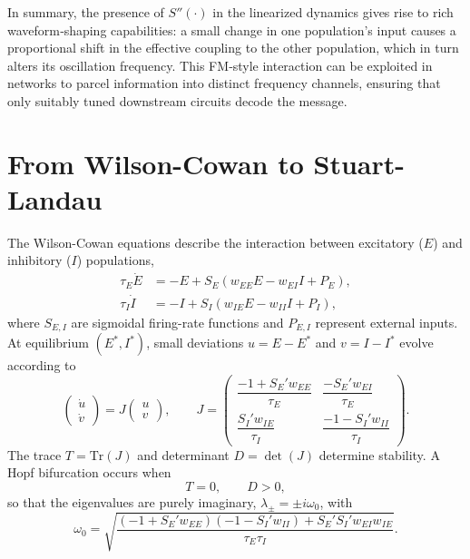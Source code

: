 In summary, the presence of \(S''(\cdot)\) in the linearized dynamics gives rise to rich waveform‐shaping capabilities: a small change in one population’s input causes a proportional shift in the effective coupling to the other population, which in turn alters its oscillation frequency.  This FM‐style interaction can be exploited in networks to parcel information into distinct frequency channels, ensuring that only suitably tuned downstream circuits decode the message.


\clearpage

\section{From Wilson-Cowan to Stuart-Landau}
\label{app:WILCO2SL}
The Wilson-Cowan equations describe the interaction between excitatory ($E$) and inhibitory ($I$) populations,
\begin{align}
\tau_E \dot{E} &= -E + S_E(w_{EE}E - w_{EI}I + P_E),\\
\tau_I \dot{I} &= -I + S_I(w_{IE}E - w_{II}I + P_I),
\end{align}
where $S_{E,I}$ are sigmoidal firing-rate functions and $P_{E,I}$ represent external inputs. 
At equilibrium $(E^*, I^*)$, small deviations $u = E - E^*$ and $v = I - I^*$ evolve according to
\begin{equation}
\begin{pmatrix}\dot{u}\\[2pt]\dot{v}\end{pmatrix}
= J \begin{pmatrix}u\\[2pt]v\end{pmatrix},
\qquad
J =
\begin{pmatrix}
\dfrac{-1 + S_E' w_{EE}}{\tau_E} & \dfrac{- S_E' w_{EI}}{\tau_E}\\[6pt]
\dfrac{S_I' w_{IE}}{\tau_I} & \dfrac{-1 - S_I' w_{II}}{\tau_I}
\end{pmatrix}.
\end{equation}
The trace $T=\mathrm{Tr}(J)$ and determinant $D=\det(J)$ determine stability.  
A Hopf bifurcation occurs when
\begin{equation}
T = 0, \qquad D > 0,
\end{equation}
so that the eigenvalues are purely imaginary, $\lambda_{\pm} = \pm i\omega_0$, with
\begin{equation}
\omega_0 =
\sqrt{\frac{
(-1 + S_E' w_{EE})(-1 - S_I' w_{II}) + S_E' S_I' w_{EI} w_{IE}
}{\tau_E \tau_I}}.
\end{equation}
